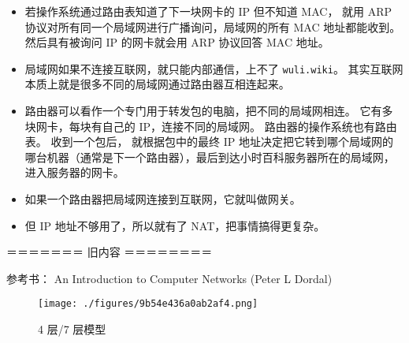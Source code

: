 \begin{itemize}
\item 若操作系统通过路由表知道了下一块网卡的 IP 但不知道 MAC， 就用 ARP 协议对所有同一个局域网进行广播询问，局域网的所有 MAC 地址都能收到。 然后具有被询问 IP 的网卡就会用 ARP 协议回答 MAC 地址。
\item 局域网如果不连接互联网，就只能内部通信，上不了 \verb`wuli.wiki`。 其实互联网本质上就是很多不同的局域网通过路由器互相连起来。
\item 路由器可以看作一个专门用于转发包的电脑，把不同的局域网相连。 它有多块网卡，每块有自己的 IP，连接不同的局域网。 路由器的操作系统也有路由表。 收到一个包后， 就根据包中的最终 IP 地址决定把它转到哪个局域网的哪台机器（通常是下一个路由器），最后到达小时百科服务器所在的局域网， 进入服务器的网卡。
\item 如果一个路由器把局域网连接到互联网，它就叫做网关。
\item 但 IP 地址不够用了，所以就有了 NAT，把事情搞得更复杂。
\end{itemize}


＝＝＝＝＝＝＝ 旧内容 ＝＝＝＝＝＝＝＝

参考书： An Introduction to Computer Networks (Peter L Dordal)

\begin{figure}[ht]
\centering
\texttt{[image: ./figures/9b54e436a0ab2af4.png]}
\caption{4 层/7 层模型} \label{fig_NetNt_1}
\end{figure}

